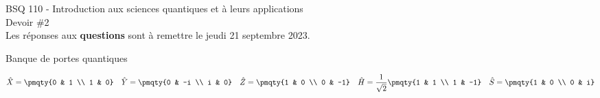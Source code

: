 \documentclass[11pt]{article}
\begin{document}
\begin{center}
  {\Large BSQ 110 - Introduction aux sciences quantiques et à leurs applications} \\ \vspace{5mm}
  {\LARGE\sffamily Devoir \#2} \\
  Les réponses aux \textbf{questions} sont à remettre le jeudi 21 septembre 2023.
\end{center}

\def\exerpath{questions}

\begin{linedsection}{Banque de portes quantiques}

  \begin{align*}
    \hat{X} = \pmqty{0 & 1 \\ 1 & 0} \quad \hat{Y} = \pmqty{0 & -i \\ i & 0} \quad \hat{Z} = \pmqty{1 & 0 \\ 0 & -1} \quad \hat{H} = \frac{1}{\sqrt{2}}\pmqty{1 & 1 \\ 1 & -1} \quad \hat{S} = \pmqty{1 & 0 \\ 0 & i}
  \end{align*}
\end{linedsection}




\end{document}
